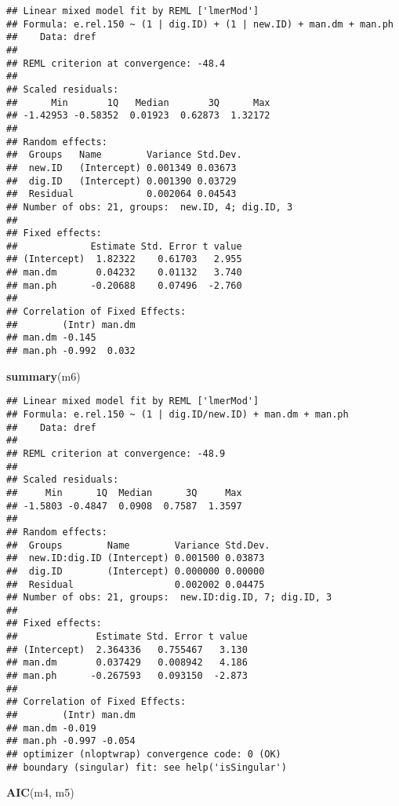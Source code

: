 \documentclass[
]{article}
\newenvironment{Shaded}{\begin{snugshade}}{\end{snugshade}}
\newcommand{\FunctionTok}[1]{\textcolor[rgb]{0.13,0.29,0.53}{\textbf{#1}}}
\newcommand{\NormalTok}[1]{#1}
\begin{document}
\begin{verbatim}
## Linear mixed model fit by REML ['lmerMod']
## Formula: e.rel.150 ~ (1 | dig.ID) + (1 | new.ID) + man.dm + man.ph
##    Data: dref
## 
## REML criterion at convergence: -48.4
## 
## Scaled residuals: 
##      Min       1Q   Median       3Q      Max 
## -1.42953 -0.58352  0.01923  0.62873  1.32172 
## 
## Random effects:
##  Groups   Name        Variance Std.Dev.
##  new.ID   (Intercept) 0.001349 0.03673 
##  dig.ID   (Intercept) 0.001390 0.03729 
##  Residual             0.002064 0.04543 
## Number of obs: 21, groups:  new.ID, 4; dig.ID, 3
## 
## Fixed effects:
##             Estimate Std. Error t value
## (Intercept)  1.82322    0.61703   2.955
## man.dm       0.04232    0.01132   3.740
## man.ph      -0.20688    0.07496  -2.760
## 
## Correlation of Fixed Effects:
##        (Intr) man.dm
## man.dm -0.145       
## man.ph -0.992  0.032
\end{verbatim}

\begin{Shaded}
\begin{Highlighting}[]
\FunctionTok{summary}\NormalTok{(m6)}
\end{Highlighting}
\end{Shaded}

\begin{verbatim}
## Linear mixed model fit by REML ['lmerMod']
## Formula: e.rel.150 ~ (1 | dig.ID/new.ID) + man.dm + man.ph
##    Data: dref
## 
## REML criterion at convergence: -48.9
## 
## Scaled residuals: 
##     Min      1Q  Median      3Q     Max 
## -1.5803 -0.4847  0.0908  0.7587  1.3597 
## 
## Random effects:
##  Groups        Name        Variance Std.Dev.
##  new.ID:dig.ID (Intercept) 0.001500 0.03873 
##  dig.ID        (Intercept) 0.000000 0.00000 
##  Residual                  0.002002 0.04475 
## Number of obs: 21, groups:  new.ID:dig.ID, 7; dig.ID, 3
## 
## Fixed effects:
##              Estimate Std. Error t value
## (Intercept)  2.364336   0.755467   3.130
## man.dm       0.037429   0.008942   4.186
## man.ph      -0.267593   0.093150  -2.873
## 
## Correlation of Fixed Effects:
##        (Intr) man.dm
## man.dm -0.019       
## man.ph -0.997 -0.054
## optimizer (nloptwrap) convergence code: 0 (OK)
## boundary (singular) fit: see help('isSingular')
\end{verbatim}

\begin{Shaded}
\begin{Highlighting}[]
\FunctionTok{AIC}\NormalTok{(m4, m5)}
\end{Highlighting}
\end{Shaded}
\end{document}
